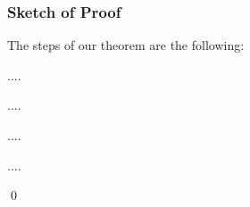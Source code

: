 \documentclass[xcolor=dvipsnames]{beamer}
\begin{document}
\begin{frame}
\frametitle{Sketch of Proof}
The steps of our theorem are the following:

\textcolor[rgb]{1.00,0.00,1.00}{} ....

\textcolor[rgb]{1.00,0.00,1.00}{} ....

\textcolor[rgb]{1.00,0.00,1.00}{} ....

\textcolor[rgb]{1.00,0.00,1.00}{} ....

\hfill \qed
\end{frame}
\end{document}
